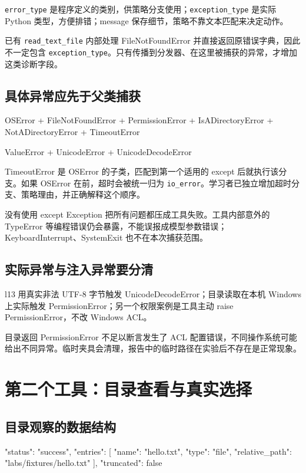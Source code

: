 \nolinkurl{error_type} 是程序定义的类别，供策略分支使用；\nolinkurl{exception_type} 是实际 Python 类型，方便排错；message 保存细节，策略不靠文本匹配来决定动作。

已有 \nolinkurl{read_text_file} 内部处理 FileNotFoundError 并直接返回原错误字典，因此不一定包含 \nolinkurl{exception_type}。只有传播到分发器、在这里被捕获的异常，才增加这类诊断字段。

\subsection{具体异常应先于父类捕获}

\begin{Code}
OSError
  + FileNotFoundError
  + PermissionError
  + IsADirectoryError
  + NotADirectoryError
  + TimeoutError

ValueError
  + UnicodeError
      + UnicodeDecodeError
\end{Code}

TimeoutError 是 OSError 的子类，匹配到第一个适用的 except 后就执行该分支。如果 OSError 在前，超时会被统一归为 \nolinkurl{io_error}。学习者已独立增加超时分支、策略理由，并正确解释这个顺序。

没有使用 except Exception 把所有问题都压成工具失败。工具内部意外的 TypeError 等编程错误仍会暴露，不能误报成模型参数错误；KeyboardInterrupt、SystemExit 也不在本次捕获范围。

\subsection{实际异常与注入异常要分清}

l13 用真实非法 UTF-8 字节触发 UnicodeDecodeError；目录读取在本机 Windows 上实际触发 PermissionError；另一个权限案例是工具主动 raise PermissionError，不改 Windows ACL。

目录返回 PermissionError 不足以断言发生了 ACL 配置错误，不同操作系统可能给出不同异常。临时夹具会清理，报告中的临时路径在实验后不存在是正常现象。

\section{第二个工具：目录查看与真实选择}

\subsection{目录观察的数据结构}

\begin{Code}
{
  "status": "success",
  "entries": [{
    "name": "hello.txt",
    "type": "file",
    "relative_path": "labs/fixtures/hello.txt"
  }],
  "truncated": false
}
\end{Code}

